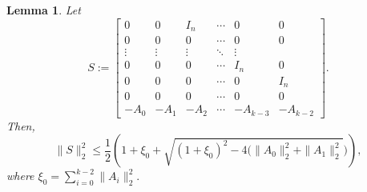 \documentclass [12pt]{article}
\newtheorem{lemma}[theorem]{Lemma}
\begin{document}
\begin{lemma}{\label{lemma 3.3}}
    Let \[
S := 
\begin{bmatrix}
0 &0 & I_n & \cdots & 0&0 \\
0 & 0 &0& \cdots &0 & 0 \\
\vdots & \vdots & \vdots & \ddots & \vdots \\
0 & 0 & 0 & \cdots & I_n &0\\
0 & 0 & 0 & \cdots & 0 & I_{n}\\
0 & 0 & 0 & \cdots & 0 &0\\
-A_0 & -A_1 & -A_2 & \cdots & -A_{k-3}&-A_{k-2}
\end{bmatrix}.
\]
Then, $$\|S\|^{2}_{2}\le \dfrac{1}{2}\left( 1+ \xi_0+ \sqrt{(1+\xi_{0})^{2}-4(\|A_{0}\|_{2}^{2}+\|A_{1}\|_{2}^{2}})\right),$$
where $\xi_{0}=\sum_{i=0}^{k-2}\|A_{i}\|_{2}^{2}.$
\end{lemma}
\end{document}
